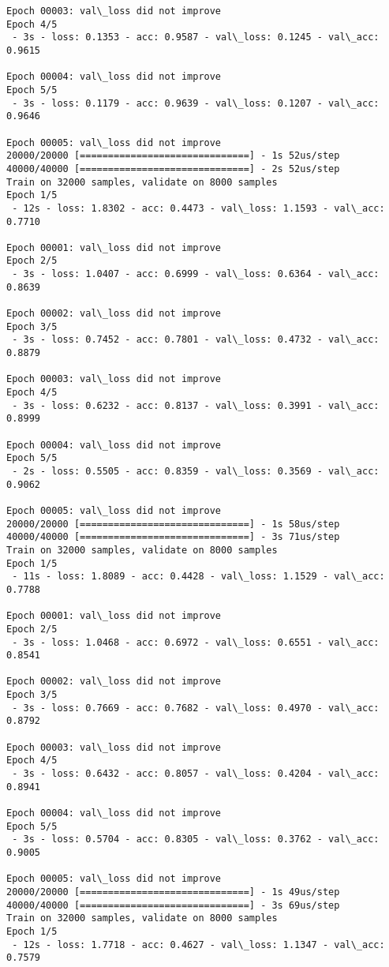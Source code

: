 \documentclass[11pt]{article}
\begin{document}
\begin{Verbatim}[commandchars=\\\{\}]
Epoch 00003: val\_loss did not improve
Epoch 4/5
 - 3s - loss: 0.1353 - acc: 0.9587 - val\_loss: 0.1245 - val\_acc: 0.9615

Epoch 00004: val\_loss did not improve
Epoch 5/5
 - 3s - loss: 0.1179 - acc: 0.9639 - val\_loss: 0.1207 - val\_acc: 0.9646

Epoch 00005: val\_loss did not improve
20000/20000 [==============================] - 1s 52us/step
40000/40000 [==============================] - 2s 52us/step
Train on 32000 samples, validate on 8000 samples
Epoch 1/5
 - 12s - loss: 1.8302 - acc: 0.4473 - val\_loss: 1.1593 - val\_acc: 0.7710

Epoch 00001: val\_loss did not improve
Epoch 2/5
 - 3s - loss: 1.0407 - acc: 0.6999 - val\_loss: 0.6364 - val\_acc: 0.8639

Epoch 00002: val\_loss did not improve
Epoch 3/5
 - 3s - loss: 0.7452 - acc: 0.7801 - val\_loss: 0.4732 - val\_acc: 0.8879

Epoch 00003: val\_loss did not improve
Epoch 4/5
 - 3s - loss: 0.6232 - acc: 0.8137 - val\_loss: 0.3991 - val\_acc: 0.8999

Epoch 00004: val\_loss did not improve
Epoch 5/5
 - 2s - loss: 0.5505 - acc: 0.8359 - val\_loss: 0.3569 - val\_acc: 0.9062

Epoch 00005: val\_loss did not improve
20000/20000 [==============================] - 1s 58us/step
40000/40000 [==============================] - 3s 71us/step
Train on 32000 samples, validate on 8000 samples
Epoch 1/5
 - 11s - loss: 1.8089 - acc: 0.4428 - val\_loss: 1.1529 - val\_acc: 0.7788

Epoch 00001: val\_loss did not improve
Epoch 2/5
 - 3s - loss: 1.0468 - acc: 0.6972 - val\_loss: 0.6551 - val\_acc: 0.8541

Epoch 00002: val\_loss did not improve
Epoch 3/5
 - 3s - loss: 0.7669 - acc: 0.7682 - val\_loss: 0.4970 - val\_acc: 0.8792

Epoch 00003: val\_loss did not improve
Epoch 4/5
 - 3s - loss: 0.6432 - acc: 0.8057 - val\_loss: 0.4204 - val\_acc: 0.8941

Epoch 00004: val\_loss did not improve
Epoch 5/5
 - 3s - loss: 0.5704 - acc: 0.8305 - val\_loss: 0.3762 - val\_acc: 0.9005

Epoch 00005: val\_loss did not improve
20000/20000 [==============================] - 1s 49us/step
40000/40000 [==============================] - 3s 69us/step
Train on 32000 samples, validate on 8000 samples
Epoch 1/5
 - 12s - loss: 1.7718 - acc: 0.4627 - val\_loss: 1.1347 - val\_acc: 0.7579


\end{Verbatim}
\end{document}
